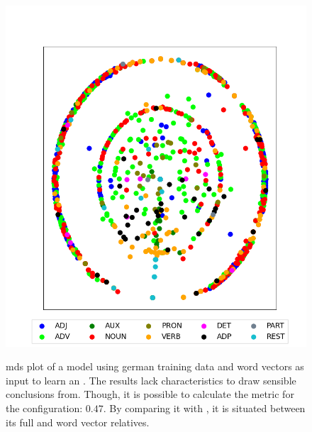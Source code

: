 \begin{figure}[H]
{		\includegraphics[width=\twocolpicwidth]{Bilder/chapter4/W2W/ground_truths/MDS_D_200pages_1500T_words.png}
	}
	\caption{\gls{mds} plot of a model using german training data and word vectors as input to learn an \onehot{}. The results lack characteristics to draw sensible conclusions from. Though, it is possible to calculate the metric for the configuration: $ 0.47 $. By comparing it with \tabref{\ref{tab: text model versions and metrics}}, it is situated between its full \onehot{} and word vector relatives.}
\end{figure}


\clearpage
